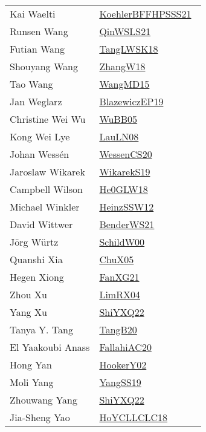 {\begin{longtable}{p{4cm}p{20cm}}
Kai Waelti & \href{works/KoehlerBFFHPSSS21.pdf}{KoehlerBFFHPSSS21}~\cite{KoehlerBFFHPSSS21}\\
Runsen Wang & \href{works/QinWSLS21.pdf}{QinWSLS21}~\cite{QinWSLS21}\\
Futian Wang & \href{works/TangLWSK18.pdf}{TangLWSK18}~\cite{TangLWSK18}\\
Shouyang Wang & \href{works/ZhangW18.pdf}{ZhangW18}~\cite{ZhangW18}\\
Tao Wang & \href{works/WangMD15.pdf}{WangMD15}~\cite{WangMD15}\\
Jan Weglarz & \href{}{BlazewiczEP19}~\cite{BlazewiczEP19}\\
Christine Wei Wu & \href{works/WuBB05.pdf}{WuBB05}~\cite{WuBB05}\\
Kong Wei Lye & \href{works/LauLN08.pdf}{LauLN08}~\cite{LauLN08}\\
Johan Wess{\'{e}}n & \href{works/WessenCS20.pdf}{WessenCS20}~\cite{WessenCS20}\\
Jaroslaw Wikarek & \href{works/WikarekS19.pdf}{WikarekS19}~\cite{WikarekS19}\\
Campbell Wilson & \href{works/He0GLW18.pdf}{He0GLW18}~\cite{He0GLW18}\\
Michael Winkler & \href{works/HeinzSSW12.pdf}{HeinzSSW12}~\cite{HeinzSSW12}\\
David Wittwer & \href{works/BenderWS21.pdf}{BenderWS21}~\cite{BenderWS21}\\
J{\"{o}}rg W{\"{u}}rtz & \href{works/SchildW00.pdf}{SchildW00}~\cite{SchildW00}\\
Quanshi Xia & \href{works/ChuX05.pdf}{ChuX05}~\cite{ChuX05}\\
Hegen Xiong & \href{works/FanXG21.pdf}{FanXG21}~\cite{FanXG21}\\
Zhou Xu & \href{works/LimRX04.pdf}{LimRX04}~\cite{LimRX04}\\
Yang Xu & \href{}{ShiYXQ22}~\cite{ShiYXQ22}\\
Tanya Y. Tang & \href{works/TangB20.pdf}{TangB20}~\cite{TangB20}\\
El Yaakoubi Anass & \href{}{FallahiAC20}~\cite{FallahiAC20}\\
Hong Yan & \href{works/HookerY02.pdf}{HookerY02}~\cite{HookerY02}\\
Moli Yang & \href{works/YangSS19.pdf}{YangSS19}~\cite{YangSS19}\\
Zhouwang Yang & \href{}{ShiYXQ22}~\cite{ShiYXQ22}\\
Jia{-}Sheng Yao & \href{works/HoYCLLCLC18.pdf}{HoYCLLCLC18}~\cite{HoYCLLCLC18}\\

\end{longtable}}
